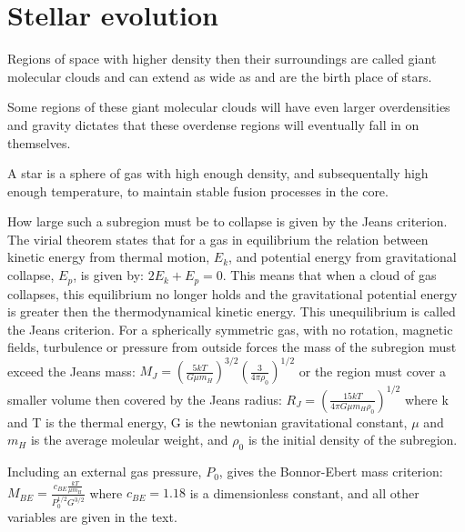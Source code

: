 \section{Stellar evolution}

Regions of space with higher density then their surroundings are called giant molecular clouds and can extend as wide as  and are the birth place of stars.

Some regions of these giant molecular clouds will have even larger overdensities and gravity dictates that these overdense regions will eventually fall in on themselves.

A star is a sphere of gas with high enough density, and subsequentally high enough temperature, to maintain stable fusion processes in the core.

How large such a subregion must be to collapse is given by the Jeans criterion. The virial theorem states that for a gas in equilibrium the relation between kinetic energy from thermal motion, $E_k$, and potential energy from gravitational collapse, $E_p$, is given by: $2E_k + E_p = 0$.
This means that when a cloud of gas collapses, this equilibrium no longer holds and the gravitational potential energy is greater then the thermodynamical kinetic energy. This unequilibrium is called the Jeans criterion.
For a spherically symmetric gas, with no rotation, magnetic fields, turbulence or pressure from outside forces the mass of the subregion must exceed the Jeans mass:
$M_J = \left(\frac{5kT}{G\mu m_H}\right)^{3/2}\left(\frac{3}{4\pi \rho_0}\right)^{1/2}$
or the region must cover a smaller volume then covered by the Jeans radius:
$R_J = \left(\frac{15kT}{4\pi G\mu m_H\rho_0}\right)^{1/2}$
where k and T is the thermal energy, G is the newtonian gravitational constant, $\mu$ and $m_H$ is the average moleular weight, and $\rho_0$ is the initial density of the subregion.

Including an external gas pressure, $P_0$, gives the Bonnor-Ebert mass criterion:
$M_{BE} = \frac{c_{BE}\frac{kT}{\mu m_H}}{P_0^{1/2}G^{3/2}}$
where $c_{BE}=1.18$ is a dimensionless constant, and all other variables are given in the text.

